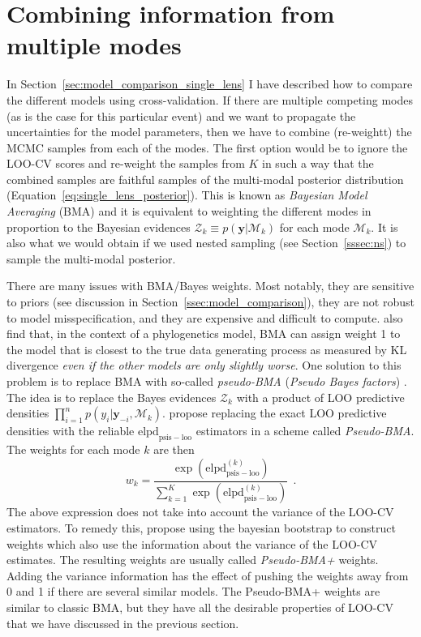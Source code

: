 \documentclass[12pt,dvipsnames]{report}
\renewcommand{\vec}[1]{\boldsymbol{\mathbf{#1}}}
\newcommand{\hquad}{~~}
\begin{document}
\section{Combining information from multiple modes}
\label{sec:averaging_over_modes}
In Section~\ref{sec:model_comparison_single_lens} I
have described how to compare the different models using cross-validation. If there are 
multiple competing modes (as is the case for this particular event) and we want to 
propagate the uncertainties for the model parameters, then we have to combine
(re-weightt) the MCMC samples from each of the modes. The first option would be to ignore 
the LOO-CV scores and re-weight the samples from $K$ in such a way that the combined 
samples are faithful samples of the multi-modal posterior distribution 
(Equation~\ref{eq:single_lens_posterior}).
This is known as \emph{Bayesian Model Averaging} (BMA) and it is equivalent to weighting 
the different modes in proportion to the Bayesian evidences 
$\mathcal{Z}_k\equiv  p(\vec y|\mathcal{M}_k)$ for each mode $\mathcal{M}_k$.
It is also what we would obtain if we used nested sampling (see Section~\ref{sssec:ns})
to sample the multi-modal posterior. 

There are many issues with BMA/Bayes weights. Most notably, they are sensitive to priors 
(see discussion in Section~\ref{ssec:model_comparison}), they are  not robust to model 
misspecification, and they are expensive and difficult to compute. 
\citet{doi:10.1073/pnas.1712673115} also find that, in the context of a phylogenetics
model, BMA can assign weight 1 to the model that is closest to the 
true data generating process as measured by KL divergence \emph{even if the other models 
are only slightly worse}. 
One solution to this problem is to replace BMA with so-called \emph{pseudo-BMA}
(\emph{Pseudo Bayes factors}) \citep{10.2307/2286745}. The idea is to replace the 
Bayes evidences $\mathcal{Z}_k$ with a product of LOO predictive 
densities $\prod_{i=1}^n p(y_i|\vec y_{-i},\mathcal{M}_k)$. 
\citet{0.1214/17-BA1091} propose replacing the exact LOO predictive densities with 
the reliable $\mathrm{elpd}_\mathrm{psis-loo}$ estimators in a scheme called 
\emph{Pseudo-BMA}.
The weights for each mode $k$ are then 
\begin{equation}
    w_k =\frac{\exp\left(\mathrm{elpd}_\mathrm{psis-loo}^{(k)}\right)}{\sum_{k=1}^K\exp\left(\mathrm{elpd}_\mathrm{psis-loo}^{(k)}\right)}
    \hquad .
\end{equation}
The above expression does not take into account the variance of the LOO-CV estimators.
To remedy this, \citet{0.1214/17-BA1091} propose
using the bayesian bootstrap \citep{10.2307/2240875,Vehtari2002BayesianMA} 
to construct weights which also use the information about the variance of the LOO-CV estimates. 
The resulting weights are usually called \emph{Pseudo-BMA+} weights. 
Adding the variance information has the effect of pushing the weights away from 0 and 1 if there are 
several similar models. The Pseudo-BMA+ weights are similar to classic BMA, but they have all 
the desirable properties of LOO-CV that we have discussed in the previous section.
\end{document}
